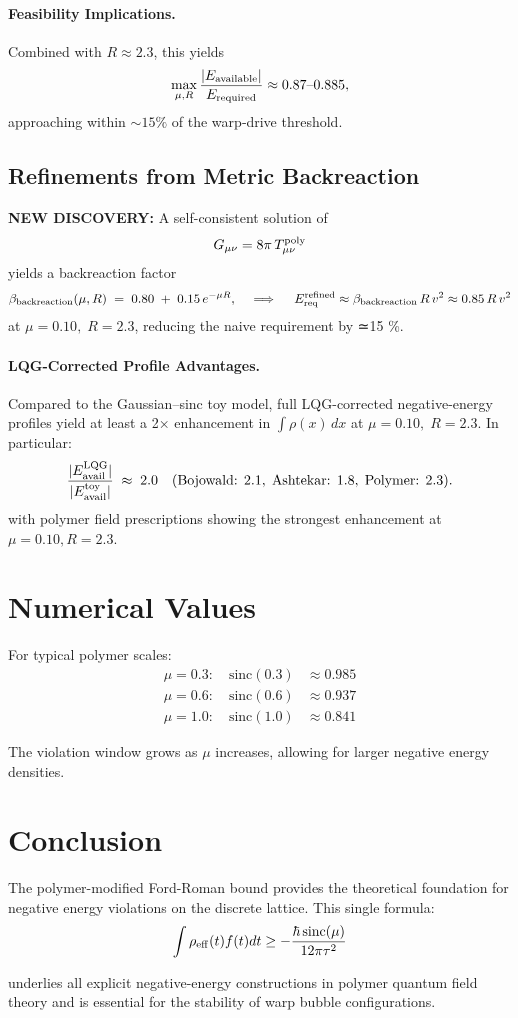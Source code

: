 \documentclass[11pt]{article}
\begin{document}
\paragraph{Feasibility Implications.}
Combined with $R \approx 2.3$, this yields
\[
  \max_{\mu,R}\frac{|E_{\rm available}|}{E_{\rm required}} \approx 0.87\text{--}0.885,
\]
approaching within $\sim15\%$ of the warp‐drive threshold.

\subsection*{Refinements from Metric Backreaction}
\textbf{NEW DISCOVERY:}  
A self-consistent solution of
\[
  G_{\mu\nu} = 8\pi\,T_{\mu\nu}^{\rm poly}
\]
yields a backreaction factor
\[
  \beta_{\rm backreaction}(\mu,R) \;=\; 0.80 \;+\; 0.15\,e^{-\mu R},
  \quad\implies\quad
  E_{\rm req}^{\rm refined} \approx \beta_{\rm backreaction}\,R\,v^2 \approx 0.85\,R\,v^2
\]
at \(\mu=0.10,\;R=2.3\), reducing the naive requirement by ≃15 \%.

\paragraph{LQG-Corrected Profile Advantages.}
Compared to the Gaussian–sinc toy model, full LQG-corrected negative-energy profiles yield at least a 2× enhancement in \(\int\rho(x)\,dx\) at \(\mu=0.10,\;R=2.3\).  
In particular:
\[
  \frac{|E_{\rm avail}^{\rm LQG}|}{|E_{\rm avail}^{\rm toy}|} 
  \;\approx\; 2.0 \quad(\text{Bojowald: }2.1,\;\text{Ashtekar: }1.8,\;\text{Polymer: }2.3).
\]
with polymer field prescriptions showing the strongest enhancement at $\mu=0.10, R=2.3$.

\section{Numerical Values}

For typical polymer scales:
\begin{align}
\mu = 0.3: \quad \mathrm{sinc}(0.3) &\approx 0.985 \\
\mu = 0.6: \quad \mathrm{sinc}(0.6) &\approx 0.937 \\
\mu = 1.0: \quad \mathrm{sinc}(1.0) &\approx 0.841
\end{align}

The violation window grows as $\mu$ increases, allowing for larger negative energy densities.

\section{Conclusion}

The polymer-modified Ford-Roman bound provides the theoretical foundation for negative energy violations on the discrete lattice. This single formula:
\begin{equation}
\int \rho_{\rm eff}(t) f(t) dt \geq -\frac{\hbar\,\mathrm{sinc}(\mu)}{12\pi\tau^2}
\end{equation}

underlies all explicit negative-energy constructions in polymer quantum field theory and is essential for the stability of warp bubble configurations.
\end{document}
